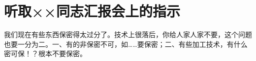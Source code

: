 \section[听取××同志汇报会上的指示（一九六五年二月二十一日上午）]{听取××同志汇报会上的指示}


我们现在有些东西保密得太过分了。技术上很落后，你给人家人家不要，这个问题也要一分为二。一、有的非保密不可，如……要保密；二、有些加工技术，有什么密可保！？根本不要保密。

